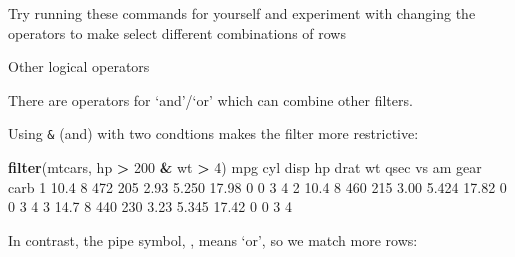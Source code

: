 \documentclass[]{article}
\newenvironment{Shaded}{\begin{snugshade}}{\end{snugshade}}
\newcommand{\DecValTok}[1]{\textcolor[rgb]{0.00,0.00,0.81}{#1}}
\newcommand{\FloatTok}[1]{\textcolor[rgb]{0.00,0.00,0.81}{#1}}
\newcommand{\KeywordTok}[1]{\textcolor[rgb]{0.13,0.29,0.53}{\textbf{#1}}}
\newcommand{\NormalTok}[1]{#1}
\newcommand{\OperatorTok}[1]{\textcolor[rgb]{0.81,0.36,0.00}{\textbf{#1}}}
\newcommand{\StringTok}[1]{\textcolor[rgb]{0.31,0.60,0.02}{#1}}
\begin{document}
Try running these commands for yourself and experiment with changing the
operators to make select different combinations of rows

Other logical operators

There are operators for `and'/`or' which can combine other filters.

Using \texttt{\&} (and) with two condtions makes the filter more restrictive:

\begin{Shaded}
\begin{Highlighting}[]
\KeywordTok{filter}\NormalTok{(mtcars, hp }\OperatorTok{>}\StringTok{ }\DecValTok{200} \OperatorTok{&}\StringTok{ }\NormalTok{wt }\OperatorTok{>}\StringTok{ }\DecValTok{4}\NormalTok{)}
\NormalTok{   mpg cyl disp  hp drat    wt  qsec vs am gear carb}
\DecValTok{1} \FloatTok{10.4}   \DecValTok{8}  \DecValTok{472} \DecValTok{205} \FloatTok{2.93} \FloatTok{5.250} \FloatTok{17.98}  \DecValTok{0}  \DecValTok{0}    \DecValTok{3}    \DecValTok{4}
\DecValTok{2} \FloatTok{10.4}   \DecValTok{8}  \DecValTok{460} \DecValTok{215} \FloatTok{3.00} \FloatTok{5.424} \FloatTok{17.82}  \DecValTok{0}  \DecValTok{0}    \DecValTok{3}    \DecValTok{4}
\DecValTok{3} \FloatTok{14.7}   \DecValTok{8}  \DecValTok{440} \DecValTok{230} \FloatTok{3.23} \FloatTok{5.345} \FloatTok{17.42}  \DecValTok{0}  \DecValTok{0}    \DecValTok{3}    \DecValTok{4}
\end{Highlighting}
\end{Shaded}

In contrast, the pipe symbol, \texttt{\textbar{}}, means `or', so we match more rows:
\end{document}
